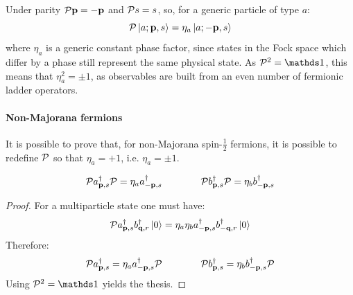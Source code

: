 Under parity $ \mathcal{P} \mathbf{p} = - \mathbf{p} $ and $ \mathcal{P} s = s $, so, for a generic particle of type $ a $:
\begin{equation}
  \mathcal{P} \ket{a; \mathbf{p},s} = \eta_a \ket{a; -\mathbf{p},s}
\end{equation}
where $ \eta_a $ is a generic constant phase factor, since states in the Fock space which differ by a phase still represent the same physical state. As $ \parity^2 = \id $, this means that $ \eta_a^2 = \pm 1 $, as observables are built from an even number of fermionic ladder operators.

\paragraph{Non-Majorana fermions}

It is possible to prove that, for non-Majorana spin-$ \frac{1}{2} $ fermions, it is possible to redefine $ \mathcal{P} $ so that $ \eta_a = +1 $, i.e. $ \eta_a = \pm 1 $.

\begin{proposition}[before upper = {\tcbtitle}]{}{}
  \begin{equation}
    \mathcal{P} a_{\mathbf{p},s}^\dagger \mathcal{P} = \eta_a a_{-\mathbf{p},s}^\dagger
    \qquad \qquad
    \mathcal{P} b_{\mathbf{p},s}^\dagger \mathcal{P} = \eta_b b_{-\mathbf{p},s}^\dagger
    \label{eq:parity-op}
  \end{equation}
\end{proposition}

\begin{proofbox}
  \begin{proof}
    For a multiparticle state one must have:
    \begin{equation*}
      \mathcal{P} a_{\mathbf{p},s}^\dagger b_{\mathbf{q},r}^\dagger \ket{0} = \eta_a \eta_b a_{-\mathbf{p},s}^\dagger b_{-\mathbf{q},r}^\dagger \ket{0}
    \end{equation*}
    Therefore:
    \begin{equation*}
      \mathcal{P} a_{\mathbf{p},s}^\dagger = \eta_a a_{-\mathbf{p},s}^\dagger \mathcal{P}
      \qquad \qquad
      \mathcal{P} b_{\mathbf{p},s}^\dagger = \eta_b b_{-\mathbf{p},s}^\dagger \mathcal{P}
    \end{equation*}
    Using $ \parity^2 = \id $ yields the thesis.
  \end{proof}
\end{proofbox}

